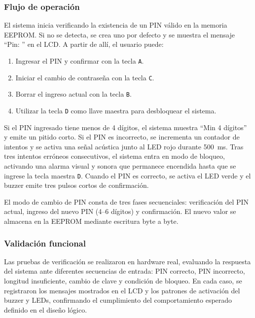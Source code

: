 \subsubsection{Flujo de operación}

El sistema inicia verificando la existencia de un PIN válido en la memoria EEPROM. 
Si no se detecta, se crea uno por defecto y se muestra el mensaje “Pin: ” en el LCD.  
A partir de allí, el usuario puede:
\begin{enumerate}
    \item Ingresar el PIN y confirmar con la tecla \texttt{A}.  
    \item Iniciar el cambio de contraseña con la tecla \texttt{C}.  
    \item Borrar el ingreso actual con la tecla \texttt{B}.  
    \item Utilizar la tecla \texttt{D} como llave maestra para desbloquear el sistema.
\end{enumerate}

Si el PIN ingresado tiene menos de 4 dígitos, el sistema muestra “Min 4 dígitos” y emite un pitido corto.  
Si el PIN es incorrecto, se incrementa un contador de intentos y se activa una señal acústica junto al LED rojo durante 500~ms.  
Tras tres intentos erróneos consecutivos, el sistema entra en modo de bloqueo, 
activando una alarma visual y sonora que permanece encendida hasta que se ingrese la tecla maestra \texttt{D}.  
Cuando el PIN es correcto, se activa el LED verde y el buzzer emite tres pulsos cortos de confirmación.

El modo de cambio de PIN consta de tres fases secuenciales: verificación del PIN actual, ingreso del nuevo PIN (4–6 dígitos) y confirmación.  
El nuevo valor se almacena en la EEPROM mediante escritura byte a byte.

\subsubsection{Validación funcional}

Las pruebas de verificación se realizaron en hardware real, 
evaluando la respuesta del sistema ante diferentes secuencias de entrada: 
PIN correcto, PIN incorrecto, longitud insuficiente, cambio de clave y condición de bloqueo.  
En cada caso, se registraron los mensajes mostrados en el LCD y los patrones de activación del buzzer y LEDs, 
confirmando el cumplimiento del comportamiento esperado definido en el diseño lógico.
